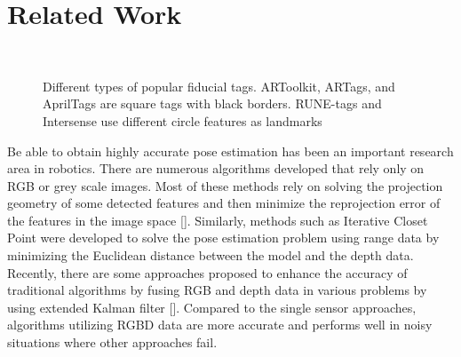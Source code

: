 \section{Related Work}
\label{sec:related}
\begin{figure}
\centering
{} \quad
{} \quad 
{} \\
 \quad
{}
\caption{Different types of popular fiducial tags. ARToolkit, ARTags, and AprilTags are square tags with black borders. RUNE-tags and Intersense use different circle features as landmarks}
\label{fig:exp_setup}
\end{figure}
	Be able to obtain highly accurate pose estimation has been an important research area in robotics. There are numerous algorithms developed that rely only on RGB or grey scale images. Most of these methods rely on solving the projection geometry of some detected features and then minimize the reprojection error of the features in the image space [].  Similarly, methods such as Iterative Closet Point were developed to solve the pose estimation problem using range data by minimizing the Euclidean distance between the model and the depth data. Recently, there are some approaches proposed to enhance the accuracy of traditional algorithms by fusing RGB and depth data in various problems by using extended Kalman filter []. Compared to the single sensor approaches, algorithms utilizing RGBD data are more accurate and performs well in noisy situations where other approaches fail. 
	
